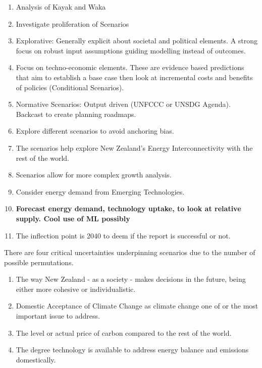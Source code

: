 \documentclass[12pt]{article}
\begin{document}
    \begin{enumerate}
        \item Analysis of Kayak and Waka
        \item Investigate proliferation of Scenarios
        \item Explorative: Generally explicit about societal and political elements.
        A strong focus on robust input assumptions guiding modelling instead of outcomes.
        \item Focus on techno-economic elements. These are evidence based predictions that aim to
        establish a base case then look at incremental costs and benefits of policies (Conditional Scenarios).
        \item Normative Scenarios: Output driven (UNFCCC or UNSDG Agenda). Backcast to create planning roadmaps.
        \item Explore different scenarios to avoid anchoring bias.
        \item The scenarios help explore New Zealand's Energy Interconnectivity with the rest of the world.
        \item Scenarios allow for more complex growth analysis.
        \item Consider energy demand from Emerging Technologies.
        \item \textbf{Forecast energy demand, technology uptake, to look at relative supply. Cool use of ML possibly}
        \item The inflection point is 2040 to deem if the report is successful or not.
    \end{enumerate}
    There are four critical uncertainties underpinning scenarios due to the number of possible permutations.
    \begin{enumerate}
        \item The way New Zealand - as a society - makes decisions in the future, being either more cohesive or individualistic.
        \item Domestic Acceptance of Climate Change as climate change one of or the most important issue to address.
        \item The level or actual price of carbon compared to the rest of the world.
        \item The degree technology is available to address energy balance and emissions domestically.
    \end{enumerate}
\end{document}
